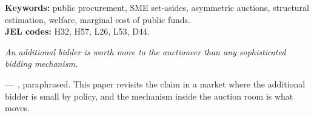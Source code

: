 \documentclass[12pt]{elsarticle}
\begin{document}
\textbf{Keywords:} public procurement, SME set-asides, asymmetric auctions, structural estimation, welfare, marginal cost of public funds.\\
\textbf{JEL codes:} H32, H57, L26, L53, D44.

\epigraph{\emph{An additional bidder is worth more to the auctioneer than any sophisticated bidding mechanism.}}{---~\citet{bulow1996}, paraphrased. This paper revisits the claim in a market where the additional bidder is small by policy, and the mechanism inside the auction room is what moves.}












\clearpage




\end{document}
